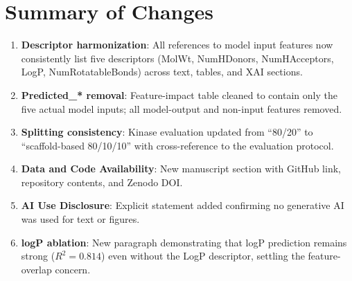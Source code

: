 \documentclass[12pt]{article}
\begin{document}
\section*{Summary of Changes}

\begin{enumerate}[leftmargin=*]
\item \textbf{Descriptor harmonization}: All references to model input features now consistently list five descriptors (MolWt, NumHDonors, NumHAcceptors, LogP, NumRotatableBonds) across text, tables, and XAI sections.
\item \textbf{Predicted\_* removal}: Feature-impact table cleaned to contain only the five actual model inputs; all model-output and non-input features removed.
\item \textbf{Splitting consistency}: Kinase evaluation updated from ``80/20'' to ``scaffold-based 80/10/10'' with cross-reference to the evaluation protocol.
\item \textbf{Data and Code Availability}: New manuscript section with GitHub link, repository contents, and Zenodo DOI.
\item \textbf{AI Use Disclosure}: Explicit statement added confirming no generative AI was used for text or figures.
\item \textbf{logP ablation}: New paragraph demonstrating that logP prediction remains strong ($R^2 = 0.814$) even without the LogP descriptor, settling the feature-overlap concern.
\end{enumerate}
\end{document}
